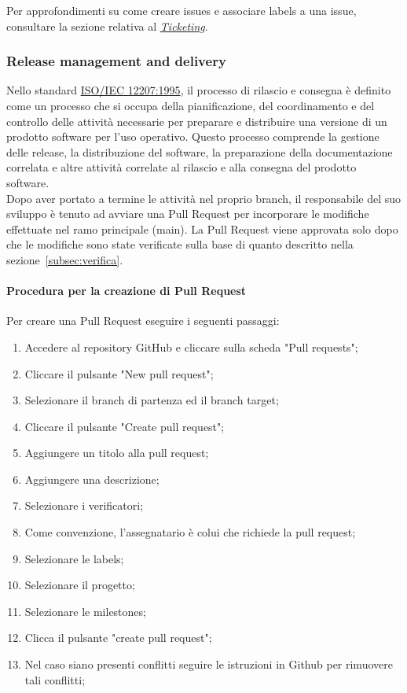 Per approfondimenti su come creare issues e associare labels a una issue, consultare la sezione relativa al \hyperlink{par:ticketing}{\textit{Ticketing}}.

\subsubsection{Release management and delivery}
Nello standard \href{https://www.math.unipd.it/~tullio/IS-1/2009/Approfondimenti/ISO_12207-1995.pdf}{ISO/IEC 12207:1995}, il processo di rilascio e consegna è definito come un processo che si occupa della pianificazione, del coordinamento e del controllo delle attività necessarie per preparare e distribuire una versione di un prodotto software per l'uso operativo. Questo processo comprende la gestione delle release, la distribuzione del software, la preparazione della documentazione correlata e altre attività correlate al rilascio e alla consegna del prodotto software. \\
Dopo aver portato a termine le attività nel proprio branch, il responsabile del suo sviluppo è tenuto ad avviare una Pull Request per incorporare le modifiche effettuate nel ramo principale (main). La Pull Request viene approvata solo dopo che le modifiche sono state verificate sulla base di quanto descritto nella sezione~\ref{subsec:verifica}.

\paragraph*{Procedura per la creazione di Pull Request}
Per creare una Pull Request eseguire i seguenti passaggi:
\begin{enumerate}
    \item Accedere al repository GitHub e cliccare sulla scheda "Pull requests";
    \item Cliccare il pulsante "New pull request";
    \item Selezionare il branch di partenza ed il branch target;
    \item Cliccare il pulsante "Create pull request";
    \item Aggiungere un titolo alla pull request;
    \item Aggiungere una descrizione;
    \item Selezionare i verificatori;
    \item Come convenzione, l'assegnatario è colui che richiede la pull request;
    \item Selezionare le labels;
    \item Selezionare il progetto;
    \item Selezionare le milestones;
    \item Clicca il pulsante "create pull request";
    \item Nel caso siano presenti conflitti seguire le istruzioni in Github per rimuovere tali conflitti;
\end{enumerate}

